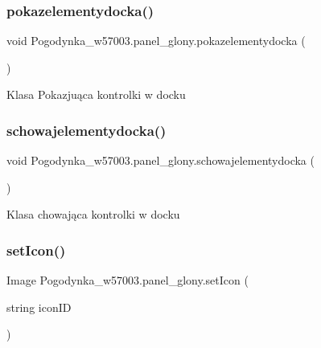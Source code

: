 \subsubsection{\texorpdfstring{pokazelementydocka()}{pokazelementydocka()}}
{\footnotesize\ttfamily void Pogodynka\+\_\+w57003.\+panel\+\_\+glony.\+pokazelementydocka (\begin{DoxyParamCaption}{ }\end{DoxyParamCaption})\hspace{0.3cm}{\ttfamily [private]}}



Klasa Pokazjuąca kontrolki w docku 

\mbox{\label{class_pogodynka__w57003_1_1panel__glony_ad2d405552ab48f25e21c26c78cb660b4}} 
\subsubsection{\texorpdfstring{schowajelementydocka()}{schowajelementydocka()}}
{\footnotesize\ttfamily void Pogodynka\+\_\+w57003.\+panel\+\_\+glony.\+schowajelementydocka (\begin{DoxyParamCaption}{ }\end{DoxyParamCaption})\hspace{0.3cm}{\ttfamily [private]}}



Klasa chowająca kontrolki w docku 

\mbox{\label{class_pogodynka__w57003_1_1panel__glony_a92d766dd29d34e246e2e99deb2591b82}} 
\subsubsection{\texorpdfstring{set\+Icon()}{setIcon()}}
{\footnotesize\ttfamily Image Pogodynka\+\_\+w57003.\+panel\+\_\+glony.\+set\+Icon (\begin{DoxyParamCaption}\item[{string}]{icon\+ID }\end{DoxyParamCaption})\hspace{0.3cm}{\ttfamily [private]}}



